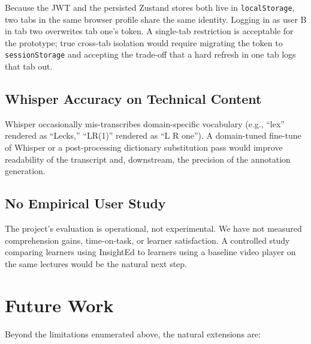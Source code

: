 \documentclass[conference]{IEEEtran}
\begin{document}
Because the JWT and the persisted Zustand stores both live in \texttt{localStorage}, two tabs in the same browser profile share the same identity. Logging in as user B in tab two overwrites tab one's token. A single-tab restriction is acceptable for the prototype; true cross-tab isolation would require migrating the token to \texttt{sessionStorage} and accepting the trade-off that a hard refresh in one tab logs that tab out.

\subsection{Whisper Accuracy on Technical Content}

Whisper occasionally mis-transcribes domain-specific vocabulary (e.g., ``lex'' rendered as ``Lecks,'' ``LR(1)'' rendered as ``L R one''). A domain-tuned fine-tune of Whisper or a post-processing dictionary substitution pass would improve readability of the transcript and, downstream, the precision of the annotation generation.

\subsection{No Empirical User Study}

The project's evaluation is operational, not experimental. We have not measured comprehension gains, time-on-task, or learner satisfaction. A controlled study comparing learners using InsightEd to learners using a baseline video player on the same lectures would be the natural next step.

\section{Future Work}\label{sec:future}

Beyond the limitations enumerated above, the natural extensions are:
\end{document}
